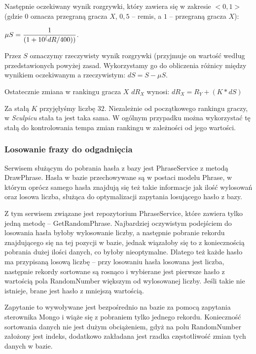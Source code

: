 Następnie oczekiwany wynik rozgrywki, który zawiera się w zakresie $<0,1>$ (gdzie $0$ oznacza przegraną gracza $X$, $0,5$ – remis, a $1$ – przegraną gracza $X$):

\begin{center}
$\displaystyle{\mu S = {{1} \over {(1+10^(dR/400))}}}$.
\end{center}

Przez $S$ oznaczymy rzeczywisty wynik rozgrywki (przyjmuje on wartość według przedstawionych powyżej zasad. Wykorzystamy go do obliczenia różnicy między wynikiem oczekiwanym a rzeczywistym: $dS=S-\mu S$.

Ostatecznie zmiana w rankingu gracza $X$ $dR_X$ wynosi: $dR_X=R_Y+(K*dS)$

Za stałą $K$ przyjęłyśmy liczbę $32$. Niezależnie od początkowego rankingu graczy, w \textit{Sculpicu} stała ta jest taka sama. W ogólnym przypadku można wykorzystać tę stałą do kontrolowania tempa zmian rankingu w zależności od jego wartości.

\subsubsection{Losowanie frazy do odgadnięcia}
Serwisem służącym do pobrania hasła z bazy jest PhraseService z metodą DrawPhrase. Hasła w bazie przechowywane są w postaci modelu Phrase, w którym oprócz samego hasła znajdują się też takie informacje jak ilość wylosowań oraz losowa liczba, służąca do optymalizacji zapytania losującego hasło z bazy.

Z tym serwisem związane jest repozytorium PhraseService, które zawiera tylko jedną metodę – GetRandomPhrase. Najbardziej oczywistym podejściem do losowania hasła byłoby wylosowanie liczby, a następnie pobranie rekordu znajdującego się na tej pozycji w bazie, jednak wiązałoby się to z koniecznością pobrania dużej ilości danych, co byłoby nieoptymalne. Dlatego też każde hasło ma przypisaną losową liczbę – przy losowaniu hasła losowana jest liczba, następnie rekordy sortowane są rosnąco i wybierane jest pierwsze hasło z wartością pola RandomNumber większym od wylosowanej liczby. Jeśli takie nie istnieje, brane jest hasło z mniejszą wartością. 

Zapytanie to wywoływane jest bezpośrednio na bazie za pomocą zapytania sterownika Mongo i wiąże się z pobraniem tylko jednego rekordu. Konieczność sortowania danych nie jest dużym obciążeniem, gdyż na polu RandomNumber założony jest indeks, dodatkowo zakładana jest rzadka częstotliwość zmian tych danych w bazie.

